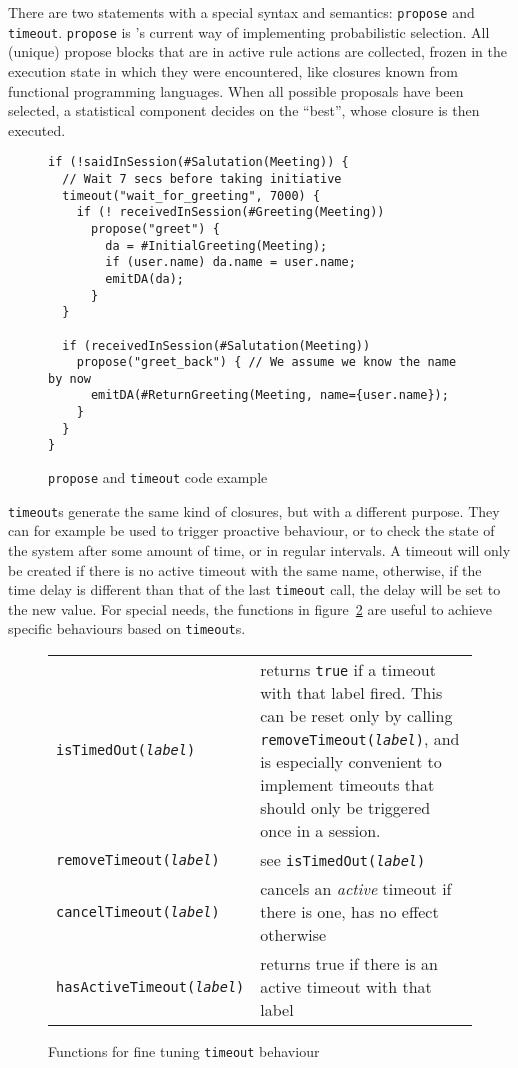 There are two statements with a special syntax and semantics: \texttt{propose}
and \texttt{timeout}. \texttt{propose} is \vonda's current way of implementing
probabilistic selection. All (unique) propose blocks that are in active rule
actions are collected, frozen in the execution state in which they were
encountered, like closures known from functional programming languages. When
all possible proposals have been selected, a statistical component decides
on the ``best'', whose closure is then executed.

\begin{figure}[h]
  \centering\small%
\begin{lstlisting}
if (!saidInSession(#Salutation(Meeting)) {
  // Wait 7 secs before taking initiative
  timeout("wait_for_greeting", 7000) {
    if (! receivedInSession(#Greeting(Meeting))
      propose("greet") {
        da = #InitialGreeting(Meeting);
        if (user.name) da.name = user.name;
        emitDA(da);
      }
  }

  if (receivedInSession(#Salutation(Meeting))
    propose("greet_back") { // We assume we know the name by now
      emitDA(#ReturnGreeting(Meeting, name={user.name});
    }
  }
}
\end{lstlisting}\vspace*{-3ex}
  \caption{\label{fig:propose}\texttt{propose} and \texttt{timeout} code example}
\end{figure}

\texttt{timeout}s generate the same kind of closures, but with a different
purpose. They can for example be used to trigger proactive behaviour, or to
check the state of the system after some amount of time, or in regular
intervals. A timeout will only be created if there is no active timeout with
the same name, otherwise, if the time delay is different than that of the last
\texttt{timeout} call, the delay will be set to the new value. For special
needs, the functions in figure~\ref{tbl:timeoutfns} are useful to achieve
specific behaviours based on \texttt{timeout}s.

\begin{figure}[htb]
\begin{tabular}{lp{}}
\texttt{isTimedOut(\emph{label})}& returns \texttt{true} if a timeout with that
  label fired. This can be reset only by calling
  \texttt{removeTimeout(\emph{label})}, and is especially convenient to
  implement timeouts that should only be triggered once in a session. \\
\texttt{removeTimeout(\emph{label})}& see \texttt{isTimedOut(\emph{label})}\\
\texttt{cancelTimeout(\emph{label})}& cancels an \emph{active} timeout if there
                                      is one, has no effect otherwise \\
\texttt{hasActiveTimeout(\emph{label})}& returns true if there is an
  active timeout with that label \\
\end{tabular}
\caption{\label{tbl:timeoutfns}Functions for fine tuning \texttt{timeout} behaviour}
\end{figure}

